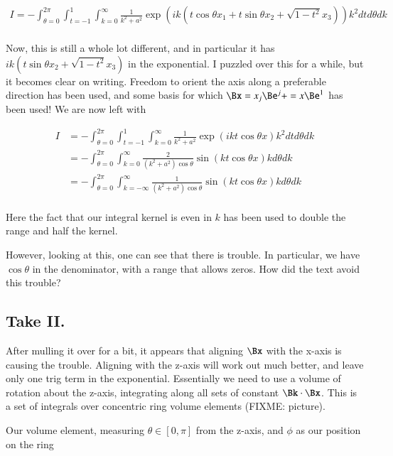 \begin{align*}
I = -\int_{\theta=0}^{2\pi} \int_{t=-1}^{1} \int_{k=0}^\infty \frac{1}{k^2 + a^2} \exp\left( i k (t \cos\theta x_1 + t \sin\theta x_2 + \sqrt{1-t^2} x_3) \right)
k^2 dt d\theta dk \\
\end{align*}

Now, this is still a whole lot different, and in particular it has $ik (t\sin\theta x_2 + \sqrt{1-t^2} x_3)$ in the exponential.  I puzzled over this for a while, but it becomes clear on writing.  Freedom to orient the axis along a preferable direction has been used, and some basis for which $\Bx = x_j \Be^j + = x \Be^1$ has been used!  We are now left with

\begin{align*}
I
&= -\int_{\theta=0}^{2\pi} \int_{t=-1}^{1} \int_{k=0}^\infty \frac{1}{k^2 + a^2} \exp\left( i k t \cos\theta x \right) k^2 dt d\theta dk \\
&= -\int_{\theta=0}^{2\pi} \int_{k=0}^\infty \frac{2}{(k^2 + a^2) \cos\theta} \sin\left( k t \cos\theta x \right) k d\theta dk \\
&= -\int_{\theta=0}^{2\pi} \int_{k=-\infty}^\infty \frac{1}{(k^2 + a^2) \cos\theta} \sin\left( k t \cos\theta x \right) k d\theta dk \\
\end{align*}

Here the fact that our integral kernel is even in $k$ has been used to double the range and half the kernel.

However, looking at this, one can see that there is trouble.  In particular, we have $\cos\theta$ in the denominator, with a range that allows zeros.  How did the text avoid this trouble?

\subsection{Take II. }

After mulling it over for a bit, it appears that aligning $\Bx$ with the x-axis is causing the trouble.  Aligning
with the
z-axis will work out much better, and leave only one trig term in the exponential.  Essentially we need to
use a volume of rotation about the z-axis, integrating along all sets of constant $\Bk \cdot \Bx$.
This is a set of integrals over concentric ring volume elements (FIXME: picture).

Our volume element, measuring $\theta \in [0, \pi]$ from the z-axis, and $\phi$ as our position on the ring

